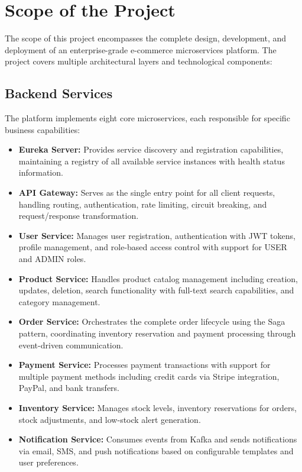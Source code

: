 \section{Scope of the Project}

The scope of this project encompasses the complete design, development, and deployment of an enterprise-grade e-commerce microservices platform. The project covers multiple architectural layers and technological components:

\subsection{Backend Services}

The platform implements eight core microservices, each responsible for specific business capabilities:

\begin{itemize}
    \item \textbf{Eureka Server:} Provides service discovery and registration capabilities, maintaining a registry of all available service instances with health status information.
    
    \item \textbf{API Gateway:} Serves as the single entry point for all client requests, handling routing, authentication, rate limiting, circuit breaking, and request/response transformation.
    
    \item \textbf{User Service:} Manages user registration, authentication with JWT tokens, profile management, and role-based access control with support for USER and ADMIN roles.
    
    \item \textbf{Product Service:} Handles product catalog management including creation, updates, deletion, search functionality with full-text search capabilities, and category management.
    
    \item \textbf{Order Service:} Orchestrates the complete order lifecycle using the Saga pattern, coordinating inventory reservation and payment processing through event-driven communication.
    
    \item \textbf{Payment Service:} Processes payment transactions with support for multiple payment methods including credit cards via Stripe integration, PayPal, and bank transfers.
    
    \item \textbf{Inventory Service:} Manages stock levels, inventory reservations for orders, stock adjustments, and low-stock alert generation.
    
    \item \textbf{Notification Service:} Consumes events from Kafka and sends notifications via email, SMS, and push notifications based on configurable templates and user preferences.
\end{itemize}

